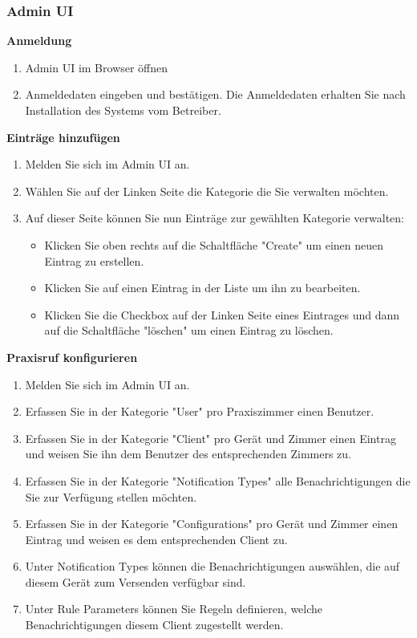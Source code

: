 \subsubsection*{Admin UI}

\textbf{Anmeldung}

\begin{enumerate}
    \item Admin UI im Browser öffnen
    \item Anmeldedaten eingeben und bestätigen. Die Anmeldedaten erhalten Sie nach Installation des Systems vom Betreiber.
\end{enumerate}

\textbf{Einträge hinzufügen}
\begin{enumerate}
    \item Melden Sie sich im Admin UI an.
    \item Wählen Sie auf der Linken Seite die Kategorie die Sie verwalten möchten.
    \item Auf dieser Seite können Sie nun Einträge zur gewählten Kategorie verwalten:
    \begin{itemize}
        \item Klicken Sie oben rechts auf die Schaltfläche "Create" um einen neuen Eintrag zu erstellen.
        \item Klicken Sie auf einen Eintrag in der Liste um ihn zu bearbeiten.
        \item Klicken Sie die Checkbox auf der Linken Seite eines Eintrages und dann auf die Schaltfläche "löschen" um einen Eintrag zu löschen.
    \end{itemize}
\end{enumerate}

\textbf{Praxisruf konfigurieren}
\begin{enumerate}
    \item Melden Sie sich im Admin UI an.
    \item Erfassen Sie in der Kategorie "User" pro Praxiszimmer einen Benutzer.
    \item Erfassen Sie in der Kategorie "Client" pro Gerät und Zimmer einen Eintrag und weisen Sie ihn dem Benutzer des entsprechenden Zimmers zu.
    \item Erfassen Sie in der Kategorie "Notification Types" alle Benachrichtigungen die Sie zur Verfügung stellen möchten.
    \item Erfassen Sie in der Kategorie "Configurations" pro Gerät und Zimmer einen Eintrag und weisen es dem entsprechenden Client zu.
    \item Unter Notification Types können die Benachrichtigungen auswählen, die auf diesem Gerät zum Versenden verfügbar sind.
    \item Unter Rule Parameters können Sie Regeln definieren, welche Benachrichtigungen diesem Client zugestellt werden.
\end{enumerate}
